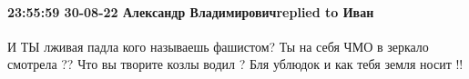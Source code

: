  
 
 
 
 

\paragraph{23:55:59 30-08-22 Александр Владимировичreplied to Иван}

И ТЫ лживая падла кого называешь фашистом? Ты на себя ЧМО в зеркало смотрела ??
Что вы творите козлы водил ? Бля ублюдок и как тебя земля носит !!
